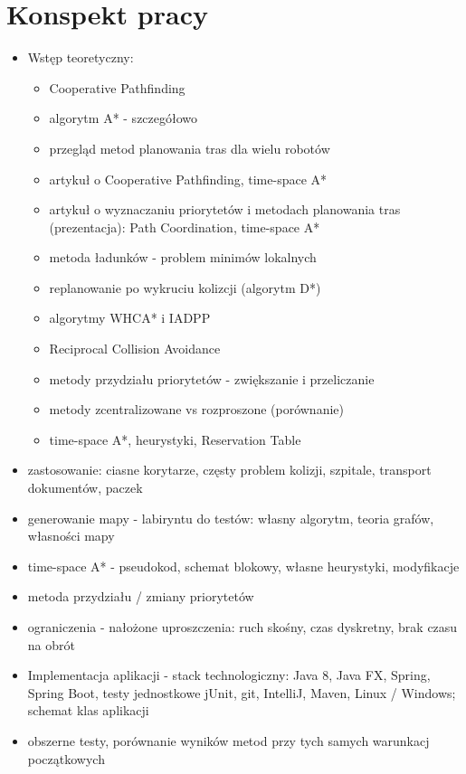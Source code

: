 \chapter{Konspekt pracy}
\label{ch:konspekt}
\begin{itemize}
	\item Wstęp teoretyczny:
	\begin{itemize}
		\item Cooperative Pathfinding
		\item algorytm A* - szczegółowo
		\item przegląd metod planowania tras dla wielu robotów
		\item artykuł o Cooperative Pathfinding, time-space A*
		\item artykuł o wyznaczaniu priorytetów i metodach planowania tras (prezentacja): Path Coordination, time-space A*
		\item metoda ładunków - problem minimów lokalnych
		\item replanowanie po wykruciu kolizcji (algorytm D*)
		\item algorytmy WHCA* i IADPP
		\item Reciprocal Collision Avoidance
		\item metody przydziału priorytetów - zwiększanie i przeliczanie
		\item metody zcentralizowane vs rozproszone (porównanie)
		\item time-space A*, heurystyki, Reservation Table
	\end{itemize}
	\item zastosowanie: ciasne korytarze, częsty problem kolizji, szpitale, transport dokumentów, paczek
	\item generowanie mapy - labiryntu do testów: własny algorytm, teoria grafów, własności mapy
	\item time-space A* - pseudokod, schemat blokowy, własne heurystyki, modyfikacje
	\item metoda przydziału / zmiany priorytetów
	\item ograniczenia - nałożone uproszczenia: ruch skośny, czas dyskretny, brak czasu na obrót
	\item Implementacja aplikacji - stack technologiczny: Java 8, Java FX, Spring, Spring Boot, testy jednostkowe jUnit, git, IntelliJ, Maven, Linux / Windows; schemat klas aplikacji
	\item obszerne testy, porównanie wyników metod przy tych samych warunkacj początkowych
\end{itemize}